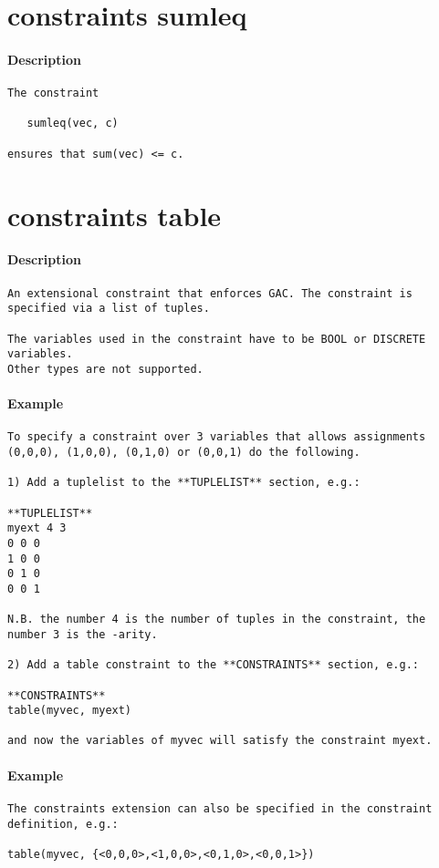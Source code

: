 \section{constraints sumleq}
\paragraph{Description}
{\footnotesize
\begin{verbatim}
The constraint

   sumleq(vec, c)

ensures that sum(vec) <= c.
\end{verbatim}
}
\section{constraints table}
\paragraph{Description}
{\footnotesize
\begin{verbatim}
An extensional constraint that enforces GAC. The constraint is
specified via a list of tuples.

The variables used in the constraint have to be BOOL or DISCRETE variables.
Other types are not supported.
\end{verbatim}
}
\paragraph{Example}
{\footnotesize
\begin{verbatim}
To specify a constraint over 3 variables that allows assignments
(0,0,0), (1,0,0), (0,1,0) or (0,0,1) do the following.

1) Add a tuplelist to the **TUPLELIST** section, e.g.:

**TUPLELIST**
myext 4 3
0 0 0
1 0 0
0 1 0
0 0 1

N.B. the number 4 is the number of tuples in the constraint, the 
number 3 is the -arity.

2) Add a table constraint to the **CONSTRAINTS** section, e.g.:

**CONSTRAINTS**
table(myvec, myext)

and now the variables of myvec will satisfy the constraint myext.
\end{verbatim}
}
\paragraph{Example}
{\footnotesize
\begin{verbatim}
The constraints extension can also be specified in the constraint
definition, e.g.:

table(myvec, {<0,0,0>,<1,0,0>,<0,1,0>,<0,0,1>})
\end{verbatim}
}
